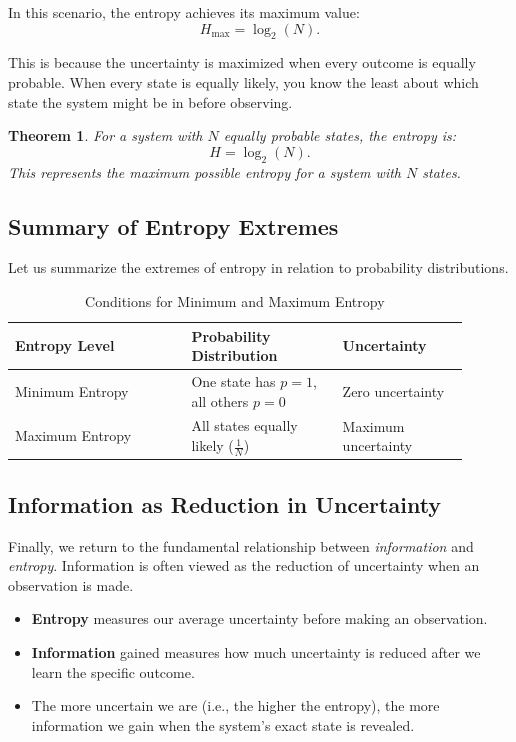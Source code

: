 \documentclass[12pt,a4paper]{article}
\newtheorem{theorem}{Theorem}[section]
\newenvironment{thmbox}[1][]{%
  \begin{tcolorbox}[enhanced, breakable, colback=thmcolor, colframe=blue!50!black, title=#1, fonttitle=\bfseries, arc=3pt, boxrule=0.5pt]
}{\end{tcolorbox}}
\newenvironment{rembox}[1][]{%
  \begin{tcolorbox}[enhanced, breakable, colback=gray!5, colframe=gray!50, title=#1, fonttitle=\bfseries, arc=3pt, boxrule=0.5pt]
}{\end{tcolorbox}}
\newenvironment{customtable}[3][htbp]{%
  \begin{table}[#1]
  \centering
  \renewcommand{\arraystretch}{1.2}
  \caption{#3}
  \begin{tabular}{#2}
}{%
  \end{tabular}
  \end{table}
}
\begin{document}
In this scenario, the entropy achieves its maximum value:
\[
H_{\text{max}} = \log_2(N).
\]

This is because the uncertainty is maximized when every outcome is equally probable. When every state is equally likely, you know the least about which state the system might be in before observing.

\begin{thmbox}[Maximum Entropy for a Uniform Distribution]
\begin{theorem}
For a system with $N$ equally probable states, the entropy is:
\[
H = \log_2(N).
\]
This represents the maximum possible entropy for a system with $N$ states.
\end{theorem}
\end{thmbox}

\subsection{Summary of Entropy Extremes}

Let us summarize the extremes of entropy in relation to probability distributions.

\begin{customtable}[h]{>{\centering}m{0.35\linewidth} >{\centering}m{0.3\linewidth} >{\centering\arraybackslash}m{0.25\linewidth}}{Conditions for Minimum and Maximum Entropy}
\toprule
\textbf{Entropy Level} & \textbf{Probability Distribution} & \textbf{Uncertainty} \\
\midrule
Minimum Entropy & One state has $p = 1$, all others $p = 0$ & Zero uncertainty \\
\midrule
Maximum Entropy & All states equally likely ($\frac{1}{N}$) & Maximum uncertainty \\
\bottomrule
\end{customtable}

\subsection{Information as Reduction in Uncertainty}

Finally, we return to the fundamental relationship between \emph{information} and \emph{entropy}. Information is often viewed as the reduction of uncertainty when an observation is made.

\begin{rembox}[Summary of Information and Entropy]
\begin{itemize}
    \item \textbf{Entropy} measures our average uncertainty before making an observation.
    \item \textbf{Information} gained measures how much uncertainty is reduced after we learn the specific outcome.
    \item The more uncertain we are (i.e., the higher the entropy), the more information we gain when the system's exact state is revealed.
\end{itemize}
\end{rembox}
\end{document}
